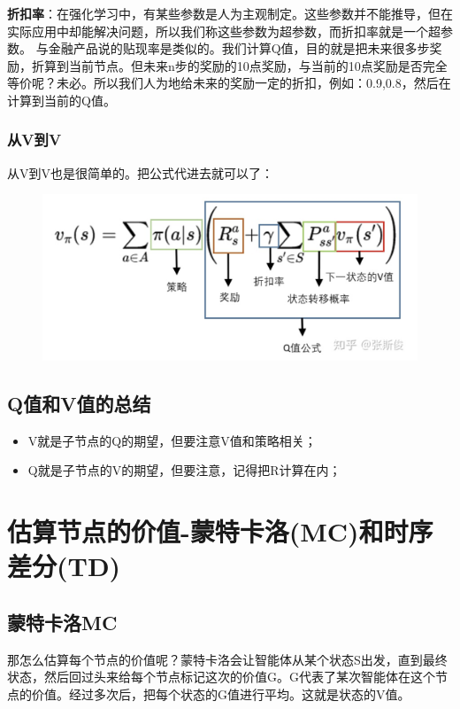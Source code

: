 \documentclass[12pt]{article}
\begin{document}
\begin{framed}
\textbf{折扣率}：在强化学习中，有某些参数是人为主观制定。这些参数并不能推导，但在实际应用中却能解决问题，所以我们称这些参数为超参数，而折扣率就是一个超参数。 与金融产品说的贴现率是类似的。我们计算Q值，目的就是把未来很多步奖励，折算到当前节点。但未来n步的奖励的10点奖励，与当前的10点奖励是否完全等价呢？未必。所以我们人为地给未来的奖励一定的折扣，例如：0.9,0.8，然后在计算到当前的Q值。
\end{framed}

\subsubsection{从V到V}
从V到V也是很简单的。把公式代进去就可以了：
\begin{figure}[H]
    \centering
    \includegraphics[width=.6\textwidth]{fig/ReinforcementLearning/RL_Compute_V_From_V_Eq.png}
\end{figure}

\subsection{Q值和V值的总结}
\begin{itemize}
\setlength{\itemsep}{0pt}
\setlength{\parsep}{0pt}
\setlength{\parskip}{0pt}
    \item V就是子节点的Q的期望，但要注意V值和策略相关；
    \item Q就是子节点的V的期望，但要注意，记得把R计算在内；
\end{itemize}

\section{估算节点的价值-蒙特卡洛(MC)和时序差分(TD)}
\subsection{蒙特卡洛MC}
那怎么估算每个节点的价值呢？蒙特卡洛会让智能体从某个状态S出发，直到最终状态，然后回过头来给每个节点标记这次的价值G。G代表了某次智能体在这个节点的价值。经过多次后，把每个状态的G值进行平均。这就是状态的V值。
\end{document}
